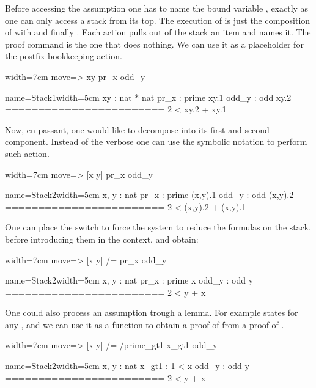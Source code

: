Before accessing the assumption  one has to name the
bound variable , exactly as one can only access a stack from its top.
The execution of  is just the composition of
 with  and finally .  Each action
pulls out of the stack an item and names it.  The  proof
command is the one that does nothing.  We can use it as a placeholder
for the postfix \C{=>} bookkeeping action.

\begin{coq}{}{width=7cm}
move=> xy pr_x odd_y
\end{coq}
\begin{coqout}{name=Stack1}{width=5cm}
 xy : nat * nat
 pr_x : prime xy.1
 odd_y : odd xy.2
========================
 2 < xy.2 + xy.1
\end{coqout}

Now, en passant, one would like to decompose  into its first
and second component.  Instead of the verbose 
one can use the symbolic notation \C{[]} to perform such action.

\begin{coq}{}{width=7cm}
move=> [x y] pr_x odd_y
\end{coq}
\begin{coqout}{name=Stack2}{width=5cm}
 x, y : nat
 pr_x : prime (x,y).1
 odd_y : odd (x,y).2
========================
 2 < (x,y).2 + (x,y).1
\end{coqout}

One can place the \C{/=} switch to force the system to reduce the formulas on
the stack, before introducing them in the context, and obtain:

\begin{coq}{}{width=7cm}
move=> [x y] /= pr_x odd_y
\end{coq}
\begin{coqout}{name=Stack2}{width=5cm}
 x, y : nat
 pr_x : prime x
 odd_y : odd y
========================
 2 < y + x
\end{coqout}

One could also process an assumption trough a lemma.  For example
 states  for any , and we can
use it as a function to obtain a proof of   from a proof
of .

\begin{coq}{}{width=7cm}
move=> [x y] /= /prime_gt1-x_gt1 odd_y
\end{coq}
\begin{coqout}{name=Stack2}{width=5cm}
 x, y : nat
 x_gt1 : 1 < x
 odd_y : odd y
========================
 2 < y + x
\end{coqout}

